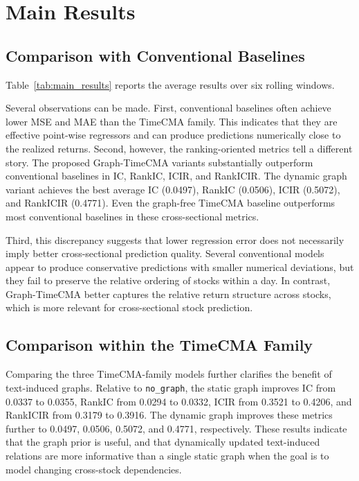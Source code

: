 \documentclass[runningheads]{llncs}
\begin{document}
\section{Main Results}

\subsection{Comparison with Conventional Baselines}

Table~\ref{tab:main_results} reports the average results over six rolling windows.

Several observations can be made. First, conventional baselines often achieve lower MSE and MAE than the TimeCMA family. This indicates that they are effective point-wise regressors and can produce predictions numerically close to the realized returns. Second, however, the ranking-oriented metrics tell a different story. The proposed Graph-TimeCMA variants substantially outperform conventional baselines in IC, RankIC, ICIR, and RankICIR. The dynamic graph variant achieves the best average IC (0.0497), RankIC (0.0506), ICIR (0.5072), and RankICIR (0.4771). Even the graph-free TimeCMA baseline outperforms most conventional baselines in these cross-sectional metrics.

Third, this discrepancy suggests that lower regression error does not necessarily imply better cross-sectional prediction quality. Several conventional models appear to produce conservative predictions with smaller numerical deviations, but they fail to preserve the relative ordering of stocks within a day. In contrast, Graph-TimeCMA better captures the relative return structure across stocks, which is more relevant for cross-sectional stock prediction.

\subsection{Comparison within the TimeCMA Family}

Comparing the three TimeCMA-family models further clarifies the benefit of text-induced graphs. Relative to \texttt{no\_graph}, the static graph improves IC from 0.0337 to 0.0355, RankIC from 0.0294 to 0.0332, ICIR from 0.3521 to 0.4206, and RankICIR from 0.3179 to 0.3916. The dynamic graph improves these metrics further to 0.0497, 0.0506, 0.5072, and 0.4771, respectively. These results indicate that the graph prior is useful, and that dynamically updated text-induced relations are more informative than a single static graph when the goal is to model changing cross-stock dependencies.
\end{document}
